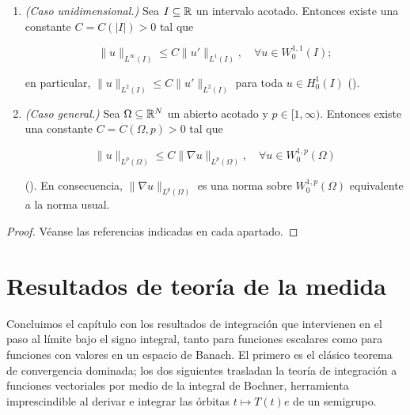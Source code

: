 \begin{Teorema}
\label{ch:preliminares:th:poincare}

\begin{enumerate}
    \item \emph{(Caso unidimensional.)} Sea $I \subseteq \mathbb{R}$ un intervalo
    acotado. Entonces existe una constante $C = C(|I|) > 0$ tal que

    \[\lVert u \rVert_{L^\infty(I)} \leq C \lVert u' \rVert_{L^1(I)}, \quad \forall u \in W_0^{1,1}(I);\]

    en particular, $\lVert u \rVert_{L^2(I)} \leq C \lVert u' \rVert_{L^2(I)}$
    para toda $u \in H_0^1(I)$ (\cite[Proposición~8.13]{brezis-2011-fun-ana-sob}).

    \item \emph{(Caso general.)} Sea $\Omega \subseteq \mathbb{R}^N$ un abierto acotado y
    $p \in [1, \infty)$. Entonces existe una constante $C = C(\Omega, p) > 0$ tal
    que

    \[\lVert u \rVert_{L^p(\Omega)} \leq C \lVert \nabla u \rVert_{L^p(\Omega)}, \quad \forall u \in W_0^{1,p}(\Omega)\]

    (\cite[Corolario~9.19]{brezis-2011-fun-ana-sob}). En consecuencia,
    $\lVert \nabla u \rVert_{L^p(\Omega)}$ es una norma sobre $W_0^{1,p}(\Omega)$
    equivalente a la norma usual.
\end{enumerate}
\end{Teorema}

\begin{proof}
Véanse las referencias indicadas en cada apartado.
\end{proof}

\section{Resultados de teoría de la medida}
\label{ch:preliminares:section:medida}

Concluimos el capítulo con los resultados de integración que intervienen en el
paso al límite bajo el signo integral, tanto para funciones escalares como para
funciones con valores en un espacio de Banach. El primero es el clásico teorema
de convergencia dominada; los dos siguientes trasladan la teoría de integración a
funciones vectoriales por medio de la integral de Bochner, herramienta
imprescindible al derivar e integrar las órbitas $t \mapsto T(t)e$ de un
semigrupo.

